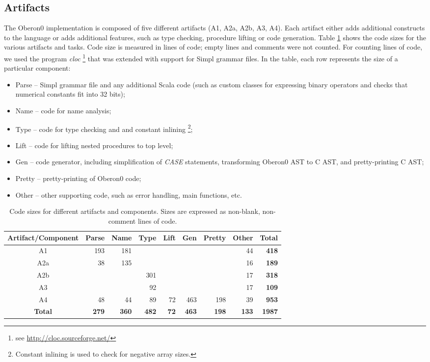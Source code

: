 \subsection{Artifacts}

The Oberon0 implementation is composed of five different artifacts
(A1, A2a, A2b, A3, A4). Each artifact either adds additional constructs
to the language or adds additional features, such as type checking,
procedure lifting or code generation. Table \ref{tab:loc-statistics}
shows the code sizes for the various artifacts and tasks. Code size
is measured in lines of code; empty lines and comments were not counted.
For counting lines of code, we used the program \emph{cloc}%
\footnote{see \url{http://cloc.sourceforge.net/}%
} that was extended with support for Simpl grammar files. In the table,
each row represents the size of a particular component:
\begin{itemize}
\item Parse -- Simpl grammar file and any additional Scala code (such as
custom classes for expressing binary operators and checks that numerical
constants fit into 32 bits);
\item Name -- code for name analysis;
\item Type -- code for type checking and and constant inlining%
\footnote{Constant inlining is used to check for negative array sizes.%
};
\item Lift -- code for lifting nested procedures to top level;
\item Gen -- code generator, including simplification of \emph{CASE} statements,
transforming Oberon0 AST to C AST, and pretty-printing C AST;
\item Pretty -- pretty-printing of Oberon0 code;
\item Other -- other supporting code, such as error handling, main functions,
etc.
\end{itemize}
\begin{table}[!h]
\caption{\label{tab:loc-statistics}Code sizes for different artifacts and
components. Sizes are expressed as non-blank, non-comment lines of
code.}


\noindent \centering{}%
\begin{tabular}{|c|r|r|r|r|r|r|r|r|}
\hline 
Artifact/Component & Parse & Name & Type & Lift & Gen & Pretty & Other & \textbf{Total}\tabularnewline
\hline 
\hline 
A1 & 193 & 181 &  &  &  &  & 44 & \textbf{418}\tabularnewline
\hline 
A2a & 38 & 135 &  &  &  &  & 16 & \textbf{189}\tabularnewline
\hline 
A2b &  &  & 301 &  &  &  & 17 & \textbf{318}\tabularnewline
\hline 
A3 &  &  & 92 &  &  &  & 17 & \textbf{109}\tabularnewline
\hline 
A4 & 48 & 44 & 89 & 72 & 463 & 198 & 39 & \textbf{953}\tabularnewline
\hline 
\textbf{Total} & \textbf{279} & \textbf{360} & \textbf{482} & \textbf{72} & \textbf{463} & \textbf{198} & \textbf{133} & \textbf{1987}\tabularnewline
\hline 
\end{tabular}
\end{table}


